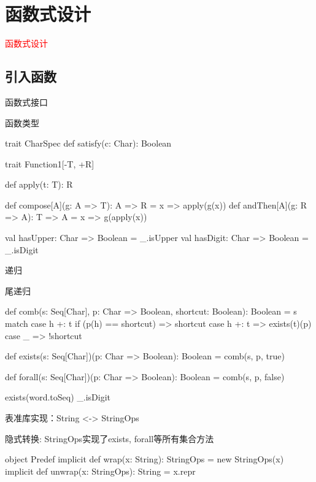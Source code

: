 \section{函数式设计}
\label{sec:fpdesign}

\begin{frame}
  \begin{center}
    \Huge{\textcolor{red}{函数式设计}}
  \end{center}
\end{frame}

\subsection{引入函数}

\begin{frame}[fragile]{函数式接口}
 \begin{block}{函数类型}
  \begin{scala}
trait CharSpec {
  def satisfy(c: Char): Boolean
}

trait Function1[-T, +R] {
  def apply(t: T): R

  def compose[A](g: A => T): A => R = x => apply(g(x))
  def andThen[A](g: R => A): T => A = x => g(apply(x)) 
}

val hasUpper: Char => Boolean = _.isUpper
val hasDigit: Char => Boolean = _.isDigit
  \end{scala}
 \end{block}
\end{frame}

\begin{frame}[fragile]{递归}
 \begin{block}{尾递归}
  \begin{scala}
def comb(s: Seq[Char], p: Char => Boolean, shortcut: Boolean): Boolean =
  s match {
    case h +: t if (p(h) == shortcut) => shortcut
    case h +: t => exists(t)(p)
    case _ => !shortcut
  }

def exists(s: Seq[Char])(p: Char => Boolean): Boolean = 
  comb(s, p, true)

def forall(s: Seq[Char])(p: Char => Boolean): Boolean = 
  comb(s, p, false)

exists(word.toSeq) { _.isDigit }
  \end{scala}
 \end{block}
\end{frame}

\begin{frame}[fragile]{表准库实现：String <-> StringOps}
 \begin{block}{隐式转换: StringOps实现了exists, forall等所有集合方法}
  \begin{scala}
object Predef {
  implicit def wrap(x: String): StringOps = new StringOps(x)
  implicit def unwrap(x: StringOps): String = x.repr
}
  \end{scala}
 \end{block}
\end{frame}

